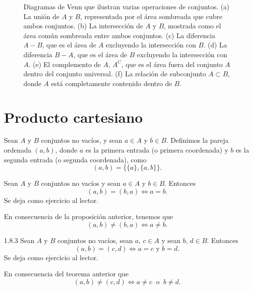 \begin{figure*}[h!]
{
    }
    \caption{Diagramas de Venn que ilustran varias operaciones de conjuntos. (a) La unión de $A$ y $B$, representada por el área sombreada que cubre ambos conjuntos. (b) La intersección de $A$ y $B$, mostrada como el área común sombreada entre ambos conjuntos. (c) La diferencia $A - B$, que es el área de $A$ excluyendo la intersección con $B$. (d) La diferencia $B - A$, que es el área de $B$ excluyendo la intersección con $A$. (e) El complemento de $A$, $A^C$, que es el área fuera del conjunto $A$ dentro del conjunto universal. (f) La relación de subconjunto $A \subset B$, donde $A$ está completamente contenido dentro de $B$.}
\end{figure*}

\section{Producto cartesiano}

\begin{definicion}{}{}
    Sean $A$ y $B$ conjuntos no vacíos, y sean $a \in A$ y $b \in B$. Definimos la pareja ordenada $(a, b)$, donde $a$ es la primera entrada (o primera coordenada) y $b$ es la segunda entrada (o segunda coordenada), como
    $$(a, b) = \big\{ \{a\}, \{ a, b \} \big\}.$$
\end{definicion}

\begin{prop}{}{}
    Sean $A$ y $B$ conjuntos no vacíos y sean $a \in A$ y $b \in B$. Entonces
    $$(a, b) = (b, a) \Longleftrightarrow a = b.$$
    \tcblower
    \demostracion Se deja como ejercicio al lector.
\end{prop}

En consecuencia de la proposición anterior, tenemos que
$$(a, b) \neq (b, a) \Longleftrightarrow a \neq b.$$

\begin{theorem}{}{1.8.3}
    Sean $A$ y $B$ conjuntos no vacíos, sean $a$, $c \in A$ y sean $b$, $d \in B$. Entonces
    $$(a, b) = (c, d) \Longleftrightarrow a=c \text{ y } b = d.$$
    \tcblower
    \demostracion Se deja como ejercicio al lector.
\end{theorem}

\newpage

En consecuencia del teorema anterior que
$$(a, b) \neq (c, d) \Longleftrightarrow a \neq c ~\text{ o }~ b \neq d.$$

